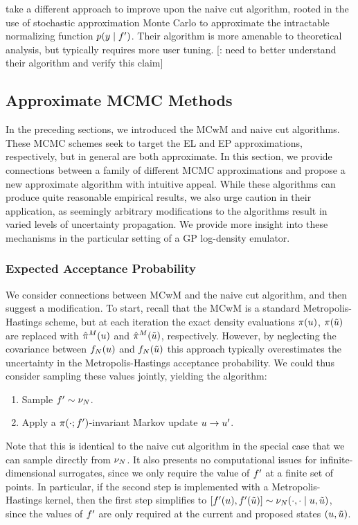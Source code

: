 \documentclass[12pt]{article}
\begin{document}
\citet{SAACut} take a different approach to improve upon the naive cut algorithm, rooted in the use
of stochastic approximation Monte Carlo to approximate the intractable normalizing function 
$p(y \mid f^\prime)$. Their algorithm is more amenable to theoretical analysis, but 
typically requires more user tuning. [\todo: need to better understand their algorithm and verify this claim]

\subsection{Approximate MCMC Methods}
In the preceding sections, we introduced the MCwM and naive cut algorithms. These MCMC schemes
seek to target the EL and EP approximations, respectively, but in general are both approximate.
In this section, we provide connections between a family of different MCMC approximations and propose
a new approximate algorithm with intuitive appeal. While these algorithms can produce quite reasonable
empirical results, we also urge caution in their application, as seemingly arbitrary modifications to the 
algorithms result in varied levels of uncertainty propagation. We provide more insight into these mechanisms
in the particular setting of a GP log-density emulator.

\subsubsection{Expected Acceptance Probability}
We consider connections between MCwM and the naive cut algorithm, and then suggest 
a modification. To start, recall that the MCwM is a standard Metropolis-Hastings scheme, but
at each iteration the exact density evaluations $\pi(u)$, $\pi(\tilde{u})$
are replaced with $\hat{\pi}^M(u)$ and $\hat{\pi}^M(\tilde{u})$, respectively.
However, by neglecting the covariance between $f_{N}(u)$ and $f_{N}(\tilde{u})$ this 
approach typically overestimates the uncertainty in the Metropolis-Hastings acceptance probability.
We could thus consider sampling these values jointly, yielding the algorithm:
\begin{enumerate}
\item Sample $f^\prime \sim \nu_{N}$.
\item Apply a $\pi(\cdot; f^\prime)$-invariant Markov update $u \to u^\prime$.
\end{enumerate}
Note that this is identical to the naive cut algorithm in the special case that we can sample directly from 
$\nu_{N}$. It also presents no computational issues for infinite-dimensional surrogates, since we only 
require the value of $f^\prime$ at a finite set of points. In particular, if the second step is implemented
with a Metropolis-Hastings kernel, then the first step simplifies to 
$[f^\prime(u), f^\prime(\tilde{u})] \sim \nu_{N}(\cdot, \cdot \mid u, \tilde{u})$, since the values
of $f^\prime$ are only required at the current and proposed states $(u, \tilde{u})$.
\end{document}
